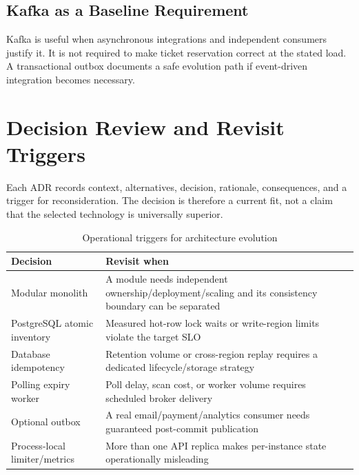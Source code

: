 \subsection{Kafka as a Baseline Requirement}
Kafka is useful when asynchronous integrations and independent consumers justify it. It is not required to make ticket reservation correct at the stated load. A transactional outbox documents a safe evolution path if event-driven integration becomes necessary.

\section{Decision Review and Revisit Triggers}
Each ADR records context, alternatives, decision, rationale, consequences, and a
trigger for reconsideration. The decision is therefore a current fit, not a
claim that the selected technology is universally superior.

\begin{table}[H]
\centering
\caption{Operational triggers for architecture evolution}
\begin{tabularx}{\textwidth}{p{}Y}
\toprule
\textbf{Decision} & \textbf{Revisit when} \\
\midrule
Modular monolith & A module needs independent ownership/deployment/scaling and its consistency boundary can be separated \\
PostgreSQL atomic inventory & Measured hot-row lock waits or write-region limits violate the target SLO \\
Database idempotency & Retention volume or cross-region replay requires a dedicated lifecycle/storage strategy \\
Polling expiry worker & Poll delay, scan cost, or worker volume requires scheduled broker delivery \\
Optional outbox & A real email/payment/analytics consumer needs guaranteed post-commit publication \\
Process-local limiter/metrics & More than one API replica makes per-instance state operationally misleading \\
\bottomrule
\end{tabularx}
\end{table}
